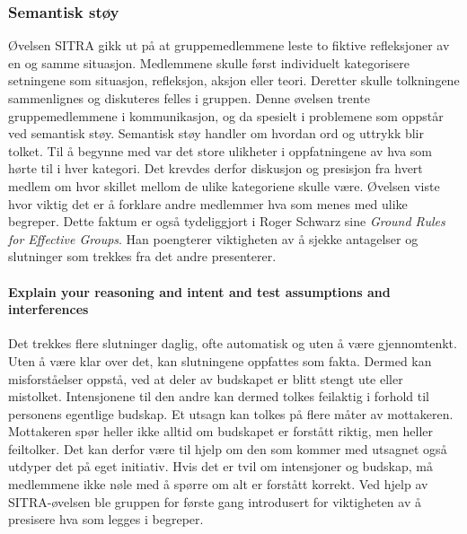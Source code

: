 \subsubsection{Semantisk støy}

Øvelsen SITRA gikk ut på at gruppemedlemmene leste to fiktive refleksjoner av en og samme situasjon.
Medlemmene skulle først individuelt kategorisere setningene som situasjon, refleksjon, aksjon eller teori.
Deretter skulle tolkningene sammenlignes og diskuteres felles i gruppen.
Denne øvelsen trente gruppemedlemmene i kommunikasjon, og da spesielt i problemene som oppstår ved semantisk støy.
Semantisk støy handler om hvordan ord og uttrykk blir tolket.
Til å begynne med var det store ulikheter i oppfatningene av hva som hørte til i hver kategori.
Det krevdes derfor diskusjon og presisjon fra hvert medlem om hvor skillet mellom de ulike kategoriene skulle være.
Øvelsen viste hvor viktig det er å forklare andre medlemmer hva som menes med ulike begreper. 
Dette faktum er også tydeliggjort i Roger Schwarz sine \textit{Ground Rules for Effective Groups}\cite{schwarz}. 
Han poengterer viktigheten av å sjekke antagelser og slutninger som trekkes fra det andre presenterer. \\

\paragraph{Explain your reasoning and intent and test assumptions and interferences} Det trekkes flere slutninger daglig, ofte automatisk og uten å være gjennomtenkt. 
Uten å være klar over det, kan slutningene oppfattes som fakta.
Dermed kan misforståelser oppstå, ved at deler av budskapet er blitt stengt ute eller mistolket. 
Intensjonene til den andre kan dermed tolkes feilaktig i forhold til personens egentlige budskap.
Et utsagn kan tolkes på flere måter av mottakeren.
Mottakeren spør heller ikke alltid om budskapet er forstått riktig, men heller feiltolker.
Det kan derfor være til hjelp om den som kommer med utsagnet også utdyper det på eget initiativ.
Hvis det er tvil om intensjoner og budskap, må medlemmene ikke nøle med å spørre om alt er forstått korrekt.
Ved hjelp av SITRA-øvelsen ble gruppen for første gang introdusert for viktigheten av å presisere hva som legges i begreper. \\

